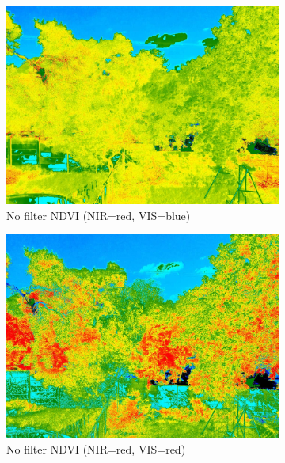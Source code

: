 \begin{appendices}
\begin{figure}[H]
\begin{subfigure}{0.5\textwidth}
\centering
\includegraphics[scale=0.17]{filter/noir_Color_Index.jpg}
\caption{No filter NDVI (NIR=red, VIS=blue)}
\end{subfigure}
\begin{subfigure}{0.5\textwidth}
\centering
\includegraphics[scale=0.17]{filter/noir_d_ndvi.jpg}
\caption{No filter NDVI (NIR=red, VIS=red)}
\end{subfigure}
\begin{subfigure}{0.5\textwidth}
\centering

\end{subfigure}
\end{figure}
\end{appendices}
